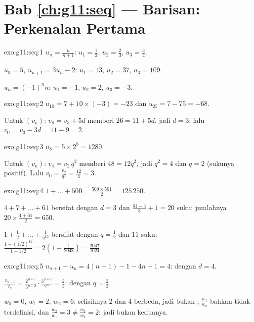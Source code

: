 \section*{Bab \ref{ch:g11:seq} --- Barisan: Perkenalan Pertama}

\begin{solution}{exo:g11:seq:1}
$u_n = \frac{n}{n+1}$: $u_1 = \frac12$, $u_2 = \frac23$,
$u_3 = \frac34$.

$u_0 = 5$, $u_{n+1} = 3u_n - 2$: $u_1 = 13$, $u_2 = 37$, $u_3 = 109$.

$u_n = (-1)^n n$: $u_1 = -1$, $u_2 = 2$, $u_3 = -3$.
\end{solution}

\begin{solution}{exo:g11:seq:2}
$u_{10} = 7 + 10 \times (-3) = -23$ dan $u_{25} = 7 - 75 = -68$.

Untuk $(v_n)$: $v_8 = v_3 + 5d$ memberi $26 = 11 + 5d$, jadi $d = 3$; lalu
$v_0 = v_3 - 3d = 11 - 9 = 2$.
\end{solution}

\begin{solution}{exo:g11:seq:3}
$u_8 = 5 \times 2^8 = 1280$.

Untuk $(v_n)$: $v_4 = v_2\, q^2$ memberi $48 = 12 q^2$, jadi $q^2 = 4$ dan
$q = 2$ (sukunya positif). Lalu
$v_0 = \frac{v_2}{q^2} = \frac{12}{4} = 3$.
\end{solution}

\begin{solution}{exo:g11:seq:4}
$1 + \dots + 500 = \frac{500 \times 501}{2} = 125\,250$.

$4 + 7 + \dots + 61$ bersifat  dengan $d = 3$ dan
$\frac{61 - 4}{3} + 1 = 20$ suku: jumlahnya
$20 \times \frac{4 + 61}{2} = 650$.

$1 + \frac12 + \dots + \frac{1}{2^{10}}$ bersifat  dengan
$q = \frac12$ dan $11$ suku:
$\frac{1 - (1/2)^{11}}{1 - 1/2} = 2\left(1 - \frac{1}{2048}\right)
= \frac{2047}{1024}$.
\end{solution}

\begin{solution}{exo:g11:seq:5}
$u_{n+1} - u_n = 4(n+1) - 1 - 4n + 1 = 4$:  dengan $d = 4$.

$\frac{v_{n+1}}{v_n} = \frac{2^{n+1}}{3^{n+2}} \cdot \frac{3^{n+1}}{2^n}
= \frac23$:  dengan $q = \frac23$.

$w_0 = 0$, $w_1 = 2$, $w_2 = 6$: selisihnya $2$ dan $4$ berbeda, jadi
bukan ; $\frac{w_1}{w_0}$ bahkan tidak terdefinisi, dan 
$\frac{w_2}{w_1} = 3 \neq \frac{w_3}{w_2} = 2$: jadi bukan keduanya.
\end{solution}

